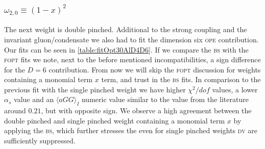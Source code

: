 \documentclass[../../index.tex]{subfiles}
\begin{document}
\subsubsection{\(\omega_{2,0} \equiv (1-x)^2\)}
The next weight is double pinched. Additional to the strong coupling and the
invariant gluon\-/condensate we also had to fit the dimension six \textsc{ope}
contribution. Our fits can be seen in \cref{table:fitOpt30AlD4D6}. If we compare
the \textsc{bs} with the \textsc{fopt} fits we note, next to the before
mentioned incompatibilities, a sign difference for the \(D=6\) contribution.
From now we will skip the \textsc{fopt} discussion for weights containing a
monomial term \(x\) term, and trust in the \textsc{bs} fits. In comparison to
the previous fit with the single pinched weight we have higher \(\chi^2/dof\)
values, a lower \(\alpha_s\) value and an \(\langle aGG \rangle_I\) numeric
value similar to the value from the literature around \(0.21\), but with
opposite sign. We observe a high agreement between the double pinched and single
pinched weight containing a monomial term \(x\) by applying the \textsc{bs},
which further stresses the even for single pinched weights \textsc{dv} are
sufficiently suppressed.
\end{document}
